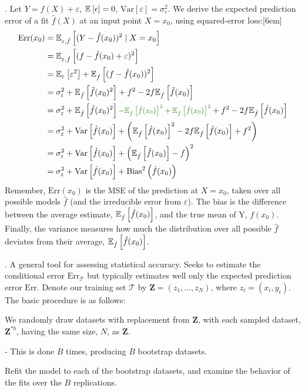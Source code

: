 \documentclass[12pt]{article}
\newcommand{\myspace}{\vspace{2\bigskipamount}}
\newcommand\p{\Needspace{10\baselineskip} \noindent}
\newcommand\Var[1]{\text{Var}\left[#1\right]}
\renewcommand{\matr}[1]{\mathbf{#1}}
\begin{document}
\myspace
\p {}. Let $Y = f(X) + \varepsilon$, $\E{\epsilon} = 0$, $\Var{\varepsilon} = \sigma_\varepsilon^2$. We derive the expected prediction error of a fit $\hat f (X)$ at an input point $X = x_0$, using squared-error loss:[6em]
\begin{align}
	\text{Err}(x_0) &= \E[\varepsilon, \hat f]{(Y - \hat f (x_0))^2 \mid X=x_0} \\
	&= \E[\varepsilon, \hat f]{(f - \hat f (x_0) + \varepsilon)^2} \\ 
	&= \E[\varepsilon]{\varepsilon^2} + \E[\hat f]{(f - \hat f (x_0))^2} \\
	&= \sigma_\varepsilon^2 + \E[\hat f]{\hat f (x_0)^2} + f^2 - 2f\E[\hat f]{\hat f (x_0)} \\
	&= \sigma_\varepsilon^2 + \E[\hat f]{\hat f (x_0)^2} \mgreen{
			- \E[\hat f]{\hat f (x_0)}^2 + \E[\hat f]{\hat f (x_0)}^2
			}
		+ f^2 - 2f\E[\hat f]{\hat f (x_0)} \\
	&= \sigma_\varepsilon^2 + \Var{\hat f (x_0)} + \left( \E[\hat f]{\hat f (x_0)}^2 - 2f \E[\hat f]{\hat f (x_0)} + f^2\right) \\
	&= \sigma_\varepsilon^2 + \Var{\hat f (x_0)} + \left(\E[\hat f]{\hat f (x_0)} - f\right)^2 \\
	&=  \sigma_\varepsilon^2 + \Var{\hat f (x_0)} + \text{Bias}^2\left(\hat f (x_0) \right)
\end{align}
Remember, $\text{Err}(x_0)$ is the MSE of the prediction at $X = x_0$, taken over all possible models $\hat f$ (and the irreducible error from $\varepsilon$). The bias is the difference between the average estimate, $\E[\hat f]{\hat f (x_0)}$, and the true mean of Y, $f(x_0)$. Finally, the variance measures how much the distribution over all possible $\hat f$ deviates from their average, $\E[\hat f]{\hat f (x_0)}$. 

\myspace
\p {}. A general tool for assessing statistical accuracy. Seeks to estimate the conditional error $\text{Err}_{\mathcal{T}}$ but typically estimates well only the expected prediction error $\text{Err}$. Denote our training set $\mathcal{T}$ by $\matr{Z} = (z_1, \ldots, z_N)$, where $z_i = (x_i, y_i)$. The basic procedure is as follows:
\begin{compactenum} 
	\item We randomly draw datasets with replacement from $\matr{Z}$, with each sampled dataset, $\matr{Z}^{*b}$, having the same size, $N$, as $\matr{Z}$. 
	
	\subitem- This is done $B$ times, producing $B$ bootstrap datasets.
	
	\item Refit the model to each of the bootstrap datasets, and examine the behavior of the fits over the $B$ replications.
\end{compactenum}
\end{document}

